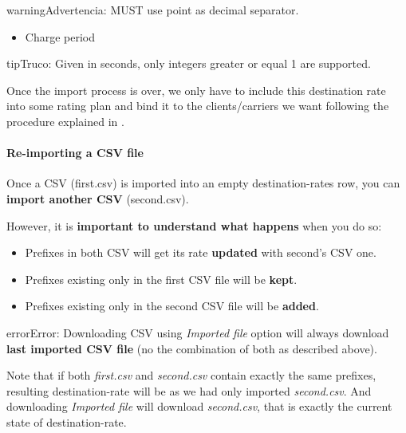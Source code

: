 \documentclass[letterpaper,10pt,spanish]{sphinxmanual}
\begin{document}
\begin{notice}{warning}{Advertencia:}
MUST use point as decimal separator.
\end{notice}
\begin{itemize}
\item {} 
Charge period

\end{itemize}

\begin{notice}{tip}{Truco:}
Given in seconds, only integers greater or equal 1 are supported.
\end{notice}

Once the import process is over, we only have to include this destination rate into some
rating plan and bind it to the clients/carriers we want following the procedure explained in
{\hyperref[administration_portal/brand/billing/rating_plans:rating\string-plans]{}}.


\paragraph{Re-importing a CSV file}
\label{administration_portal/brand/billing/destination_rates:re-importing-a-csv-file}
Once a CSV (first.csv) is imported into an empty destination-rates row, you can \textbf{import another CSV} (second.csv).

However, it is \textbf{important to understand what happens} when you do so:
\begin{itemize}
\item {} 
Prefixes in both CSV will get its rate \textbf{updated} with second's CSV one.

\item {} 
Prefixes existing only in the first CSV file will be \textbf{kept}.

\item {} 
Prefixes existing only in the second CSV file will be \textbf{added}.

\end{itemize}

\begin{notice}{error}{Error:}
Downloading CSV using \emph{Imported file} option will always download \textbf{last imported CSV file} (no the
combination of both as described above).
\end{notice}

Note that if both \emph{first.csv} and \emph{second.csv} contain exactly the same prefixes, resulting destination-rate will be as
we had only imported \emph{second.csv}. And downloading \emph{Imported file} will download \emph{second.csv}, that is exactly the current
state of destination-rate.
\end{document}

